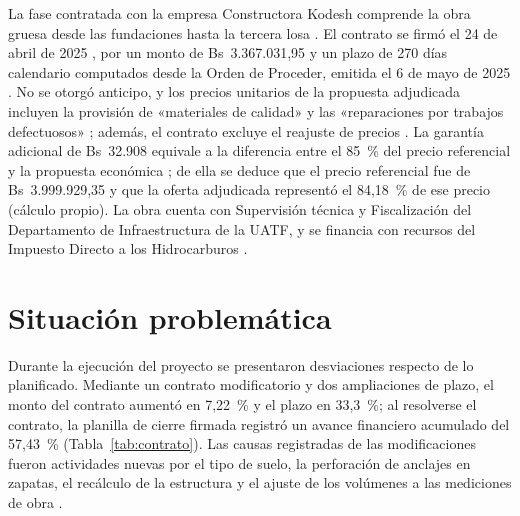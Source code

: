La fase contratada con la empresa Constructora Kodesh comprende la obra gruesa desde las fundaciones hasta la tercera losa \parencite[p.~8]{uatf2025pao2}. El contrato se firmó el 24 de abril de 2025 \parencite[p.~112]{uatf2025pao2}, por un monto de Bs~3.367.031,95 y un plazo de 270 días calendario computados desde la Orden de Proceder, emitida el 6 de mayo de 2025 \parencite[pp.~127--128]{uatf2025pao2}. No se otorgó anticipo, y los precios unitarios de la propuesta adjudicada incluyen la provisión de «materiales de calidad» y las «reparaciones por trabajos defectuosos» \parencite[p.~92]{uatf2025pao2}; además, el contrato excluye el reajuste de precios \parencite[p.~95]{uatf2025pao2}. La garantía adicional de Bs~32.908 equivale a la diferencia entre el 85~\% del precio referencial y la propuesta económica \parencite[p.~92]{uatf2025pao2}; de ella se deduce que el precio referencial fue de Bs~3.999.929,35 y que la oferta adjudicada representó el 84,18~\% de ese precio (cálculo propio). La obra cuenta con Supervisión técnica y Fiscalización del Departamento de Infraestructura de la UATF, y se financia con recursos del Impuesto Directo a los Hidrocarburos \parencite[pp.~3, 5, 91]{uatf2025pao2}.

\section{Situación problemática}

Durante la ejecución del proyecto se presentaron desviaciones respecto de lo planificado. Mediante un contrato modificatorio y dos ampliaciones de plazo, el monto del contrato aumentó en 7,22~\% y el plazo en 33,3~\%; al resolverse el contrato, la planilla de cierre firmada registró un avance financiero acumulado del 57,43~\% (Tabla~\ref{tab:contrato}). Las causas registradas de las modificaciones fueron actividades nuevas por el tipo de suelo, la perforación de anclajes en zapatas, el recálculo de la estructura y el ajuste de los volúmenes a las mediciones de obra \parencite[p.~1]{uatf_item13}.

